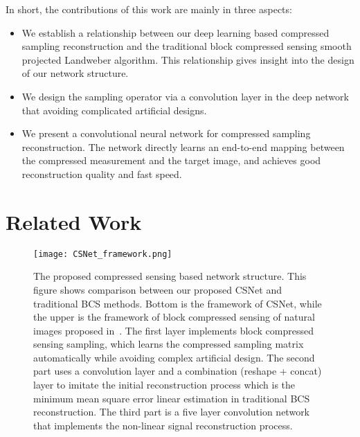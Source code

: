 \documentclass[5pt]{article}
\begin{document}
In short, the contributions of this work are mainly in three aspects:
\begin{itemize}
  \item We establish a relationship between our deep learning based compressed sampling reconstruction and the traditional block compressed sensing smooth projected Landweber algorithm. This relationship gives insight into the design of our network structure.
  \item We design the sampling operator via a convolution layer in the deep network that avoiding complicated artificial designs.
  \item We present a convolutional neural network for compressed sampling reconstruction. The network directly learns an end-to-end mapping between the compressed measurement and the target image, and achieves good reconstruction quality and fast speed.
\end{itemize}

\section{Related Work}

\begin{figure*}[t]
\centering
\texttt{[image: CSNet\_framework.png]}
\vspace{-12pt}
\caption{\footnotesize {The proposed compressed sensing based network structure. This figure shows comparison between our proposed CSNet and traditional BCS methods. Bottom is the framework of CSNet, while the upper is the framework of block compressed sensing of natural images proposed in~\cite{rf1}. The first layer implements block compressed sensing sampling, which learns the compressed sampling matrix automatically while avoiding complex artificial design. The second part uses a convolution layer and a combination (reshape + concat) layer to imitate the initial reconstruction process which is the minimum mean square error linear estimation in traditional BCS reconstruction. The third part is a five layer convolution network that implements the non-linear signal reconstruction process.}}
\vspace{-17pt}
\label{fig:fig2}
\end{figure*}
\end{document}
